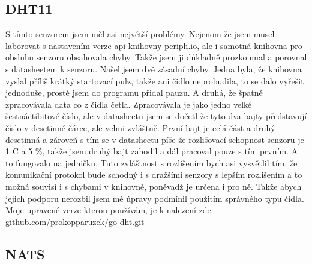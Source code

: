 \subsection{DHT11}
S tímto senzorem jsem měl asi největší problémy. Nejenom že jsem musel laborovat s nastavením verze api knihovny 
periph.io, ale i samotná knihovna pro obsluhu senzoru obsahovala chyby. Takže jsem ji důkladně prozkoumal a porovnal 
s datasheetem k senzoru. Našel jsem dvě zásadní chyby. Jedna byla, že knihovna vyslal příliš krátký startovací pulz, 
takže ani čidlo neprobudila, to se dalo vyřešit jednoduše, prostě jsem do programu přidal pauzu. A druhá, že špatně 
zpracovávala data co z čidla četla. Zpracovávala je jako jedno velké šestnáctibitové číslo, ale v datasheetu jsem se 
dočetl že tyto dva bajty představují číslo v desetinné čárce, ale velmi zvláštně. První bajt je celá část a druhý 
desetinná a zároveň s tím se v datasheetu píše že rozlišovací schopnost senzoru je 1 \textdegree C a 5 \%, takže jsem 
druhý bajt zahodil a dál pracoval pouze s tím prvním. A to fungovalo na jedničku. Tuto zvláštnost s rozlišením bych asi 
vysvětlil tím, že komunikační protokol bude schodný i s dražšími senzory s lepším rozlišením a to možná souvisí 
i s chybami v knihovně, poněvadž je určena i pro ně. Takže abych jejich podporu nerozbil jsem mé úpravy podmínil 
použitím správného typu čidla. Moje upravené verze kterou používám, je k nalezení zde 
\href{https://github.com/prokopparuzek/go-dht.git}{github.com/prokopparuzek/go-dht.git}
\subsection{NATS}
